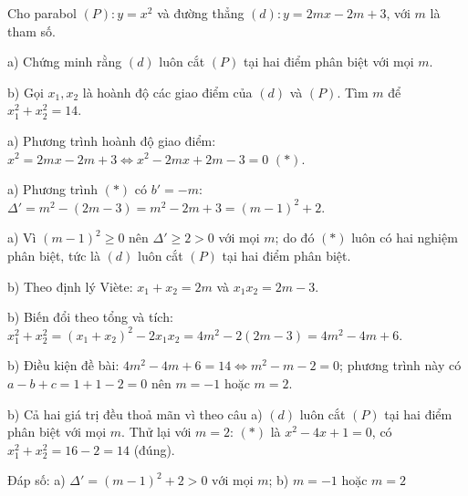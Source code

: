 \begin{problem}[9DS-HSB2-008]
Cho parabol $(P)\colon y = x^2$ và đường thẳng $(d)\colon y = 2mx - 2m + 3$, với $m$ là tham số.

a) Chứng minh rằng $(d)$ luôn cắt $(P)$ tại hai điểm phân biệt với mọi $m$.

b) Gọi $x_1, x_2$ là hoành độ các giao điểm của $(d)$ và $(P)$. Tìm $m$ để $x_1^2 + x_2^2 = 14$.

\begin{solution}
a) Phương trình hoành độ giao điểm: $x^2 = 2mx - 2m + 3 \Leftrightarrow x^2 - 2mx + 2m - 3 = 0$ $(*)$.

a) Phương trình $(*)$ có $b' = -m$: $\Delta' = m^2 - (2m - 3) = m^2 - 2m + 3 = (m - 1)^2 + 2$.

a) Vì $(m - 1)^2 \geq 0$ nên $\Delta' \geq 2 > 0$ với mọi $m$; do đó $(*)$ luôn có hai nghiệm phân biệt, tức là $(d)$ luôn cắt $(P)$ tại hai điểm phân biệt.

b) Theo định lý Viète: $x_1 + x_2 = 2m$ và $x_1 x_2 = 2m - 3$.

b) Biến đổi theo tổng và tích: $x_1^2 + x_2^2 = (x_1 + x_2)^2 - 2x_1x_2 = 4m^2 - 2(2m - 3) = 4m^2 - 4m + 6$.

b) Điều kiện đề bài: $4m^2 - 4m + 6 = 14 \Leftrightarrow m^2 - m - 2 = 0$; phương trình này có $a - b + c = 1 + 1 - 2 = 0$ nên $m = -1$ hoặc $m = 2$.

b) Cả hai giá trị đều thoả mãn vì theo câu a) $(d)$ luôn cắt $(P)$ tại hai điểm phân biệt với mọi $m$. Thử lại với $m = 2$: $(*)$ là $x^2 - 4x + 1 = 0$, có $x_1^2 + x_2^2 = 16 - 2 = 14$ (đúng).

Đáp số: a) $\boxed{\Delta' = (m - 1)^2 + 2 > 0 \text{ với mọi } m}$; b) $\boxed{m = -1 \text{ hoặc } m = 2}$
\end{solution}
\end{problem}

